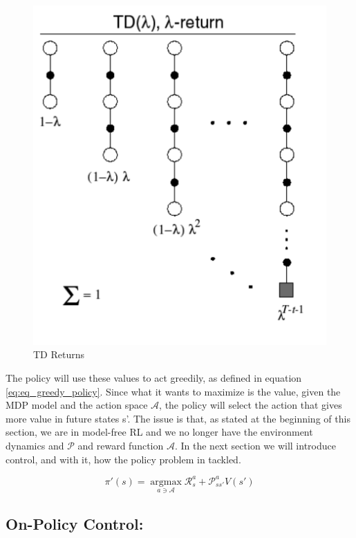 \begin{figure}[!h]
	\centering
	\includegraphics[scale=0.5]{figures/tdlambda_return.png}
	\caption{TD Returns}
	\label{fig:td_returns}
\end{figure}

The policy will use these values to act greedily, as defined in equation \ref{eq:eq_greedy_policy}. Since what it wants to maximize is the value, given the MDP model and the action space $\mathcal{A}$, the policy will select the action that gives more value in future states s'. The issue is that, as stated at the beginning of this section, we are in model-free RL and we no longer have the environment dynamics and $\mathcal{P}$ and reward function $\mathcal{A}$. In the next section we will introduce control, and with it, how the policy problem in tackled.

\begin{equation} \label{eq:eq_greedy_policy}
	\pi'(s) = \operatorname*{argmax}_{a \ni \mathcal{A}} \mathcal{R}^{a}_{s} + \mathcal{P}^{a}_{ss'} V(s')
\end{equation}

\subsection{On-Policy Control: } \label{app:on-policy-control}

